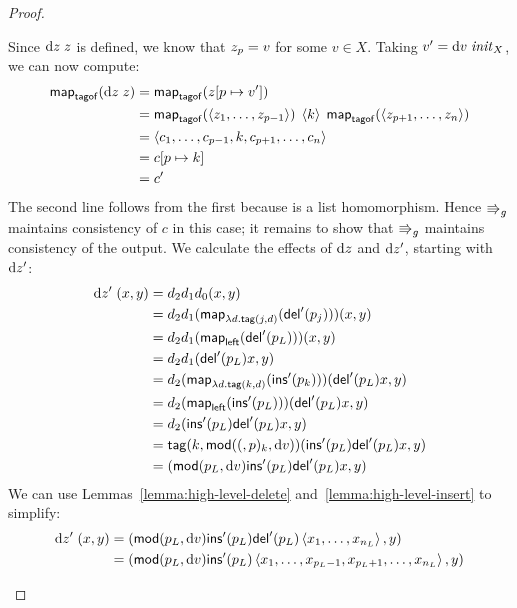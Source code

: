 \begin{proof}
{\begin{trivlist}
    Since $\textrm{d} z\;z$ is defined, we know that $z_p =  v$ for some $v \in
    X$. Taking $v'=\textrm{d} v\;\mathit{init}_X$, we can now compute:
    \begin{align*}
        \mathsf{map}_{\mathsf{tagof}}(\textrm{d} z\;z)
            &= \mathsf{map}_{\mathsf{tagof}}(z[p\mapsto{v'}]) \\
            &= \mathsf{map}_{\mathsf{tagof}}(\left< z_1,\ldots, z_{p-1}\right>)\;
               \left< k\right>\;
               \mathsf{map}_{\mathsf{tagof}}(\left< z_{p+1},\ldots, z_n\right>)\\
            &= \left< c_1,\ldots, c_{p-1}, k, c_{p+1},\ldots, c_n \right>\\
            &= c[p \mapsto k] \\
            &= c'
    \end{align*}
    The second line follows from the first because \map is a list
    homomorphism.  Hence $\mathord{\Rrightarrow}_g$ maintains consistency of $c$ in this
    case; it remains to show that $\mathord{\Rrightarrow}_g$ maintains consistency of the
    output. We calculate the effects of $\textrm{d} z$ and $\textrm{d} z'$, starting with
    $\textrm{d} z'$:
    \begin{align*}
        \textrm{d} z'\;(x,y)
            &= d_2d_1d_0(x,y) \\
            &= d_2d_1(\mathsf{map}_{\lambda d.\mathsf{tag}(j,d)}(\mathsf{del}'(p_j)))(x,y) \\
            &= d_2d_1(\mathsf{map}_{\mathsf{left}}(\mathsf{del}'(p_L)))(x,y) \\
            &= d_2d_1(\mathsf{del}'(p_L)x,y) \\
            &= d_2(\mathsf{map}_{\lambda d.\mathsf{tag}(k,d)}(\mathsf{ins}'(p_k)))(\mathsf{del}'(p_L)x,y) \\
            &= d_2(\mathsf{map}_{\mathsf{left}}(\mathsf{ins}'(p_L)))(\mathsf{del}'(p_L)x,y) \\
            &= d_2(\mathsf{ins}'(p_L)\mathsf{del}'(p_L)x,y) \\
            &= \mathsf{tag}(k,\mathsf{mod}((,p)_k,\textrm{d} v))(\mathsf{ins}'(p_L)\mathsf{del}'(p_L)x,y) \\
            &= (\mathsf{mod}(p_L,\textrm{d} v)\mathsf{ins}'(p_L)\mathsf{del}'(p_L)x,y)
    \end{align*}
    We can use Lemmas~\ref{lemma:high-level-delete}
    and~\ref{lemma:high-level-insert} to simplify:
    \begin{align*}
        \dz'\;(x,y)
            &= (\mlmod{p_L}\dv\mlinsert'(p_L)\mldelete'(p_L)\blist x_1\clist x_{n_L}\elist,y) \\
            &= (\mlmod{p_L}\dv\mlinsert'(p_L)\blist x_1\clist x_{p_L-1}\mlist x_{p_L+1}\clist x_{n_L}\elist,y) \\

\end{align*}
\end{trivlist}}
\end{proof}
